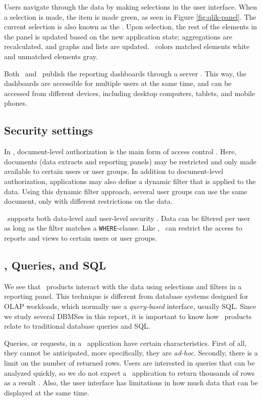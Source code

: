 Users navigate through the data by making selections in the user interface. When a selection is made, the item is made green, as seen in Figure \ref{fig:qlik-panel}. The current selection is also known as the . Upon selection, the rest of the elements in the panel is updated based on the new application state; aggregations are recalculated, and graphs and lists are updated. \qlikview~colors matched elements white and unmatched elements gray.

Both \qlikview~and \tableau~publish the reporting dashboards through a server \cite{Kamkolkar2015-iq, Qlik2011-ef}. This way, the dashboards are accessible for multiple users at the same time, and can be accessed from different devices, including desktop computers, tablets, and mobile phones.

\subsection{Security settings}
\label{sub:Security settings}
In \qlikview, document-level authorization is the main form of access control \cite{Qlik2011-hj}. Here, documents (data extracts and reporting panels) may be restricted and only made available to certain users or user groups. In addition to document-level authorization, applications may also define a dynamic filter that is applied to the data. Using this dynamic filter approach, several user groups can use the same document, only with different restrictions on the data.

\tableau~supports both data-level and user-level security \cite{Kamkolkar2015-iq}. Data can be filtered per user as long as the filter matches a \texttt{WHERE}-clause. Like \qlikview, \tableau~can restrict the access to reports and views to certain users or user groups.

\subsection{\bd, Queries, and SQL}
\label{sub:Business Discovery, Queries, and SQL}
We see that \bd~products interact with the data using selections and filters in a reporting panel. This technique is different from database systems designed for OLAP workloads, which normally use a \textit{query-based} interface, usually SQL. Since we study several DBMSes in this report, it is important to know how \bd~products relate to traditional database queries and SQL.

Queries, or requests, in a \bd~application have certain characteristics. First of all, they cannot be anticipated, more specifically, they are \textit{ad-hoc}. Secondly, there is a limit on the number of returned rows. Users are interested in queries that can be analyzed quickly, so we do not expect a \bd~application to return thousands of rows as a result \cite{Ferrari2012-hm}. Also, the user interface has limitations in how much data that can be displayed at the same time.


